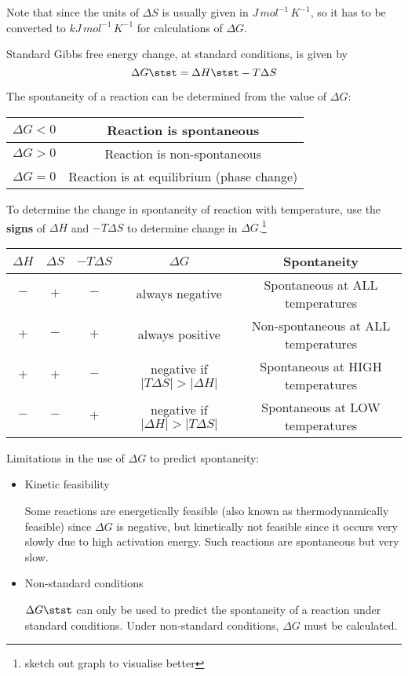 \begin{remark}
Note that since the units of $\Delta S$ is usually given in $\unit{J\,mol^{-1}\,K^{-1}}$, so it has to be converted to $\unit{kJ\,mol^{-1}\,K^{-1}}$ for calculations of $\Delta G$.
\end{remark}

Standard Gibbs free energy change, at standard conditions, is given by
\[ \Delta G\stst = \Delta H\stst - T \Delta S \]

The spontaneity of a reaction can be determined from the value of $\Delta G$:
\begin{table}[H]
\centering
\begin{tabular}{|c|c|}
\hline
$\Delta G < 0$ & Reaction is spontaneous \\
\hline
$\Delta G > 0$ & Reaction is non-spontaneous \\
\hline
$\Delta G = 0$ & Reaction is at equilibrium (phase change) \\
\hline
\end{tabular}
\end{table}

To determine the change in spontaneity of reaction with temperature, use the \textbf{signs} of $\Delta H$ and $-T\Delta S$ to determine change in $\Delta G$.\footnote{sketch out graph to visualise better}

\begin{table}[H]
\centering
\begin{tabular}{ccccc}
\hline\hline
$\Delta H$ & $\Delta S$ & $-T\Delta S$ & $\Delta G$ & Spontaneity \\
\hline
$-$ & $+$ & $-$ & always negative & Spontaneous at ALL temperatures \\
$+$ & $-$ & $+$ & always positive & Non-spontaneous at ALL temperatures \\
$+$ & $+$ & $-$ & negative if $|T\Delta S| > |\Delta H|$ & Spontaneous at HIGH temperatures \\
$-$ & $-$ & $+$ & negative if $|\Delta H| > |T\Delta S|$ & Spontaneous at LOW temperatures \\
\hline\hline
\end{tabular}
\end{table}





Limitations in the use of $\Delta G$ to predict spontaneity:
\begin{itemize}
\item Kinetic feasibility

Some reactions are energetically feasible (also known as thermodynamically feasible) since $\Delta G$ is negative, but kinetically not feasible since it occurs very slowly due to high activation energy. Such reactions are spontaneous but very slow.

\item Non-standard conditions

$\Delta G\stst$ can only be used to predict the spontaneity of a reaction under standard conditions. Under non-standard conditions, $\Delta G$ must be calculated.
\end{itemize}

\pagebreak


